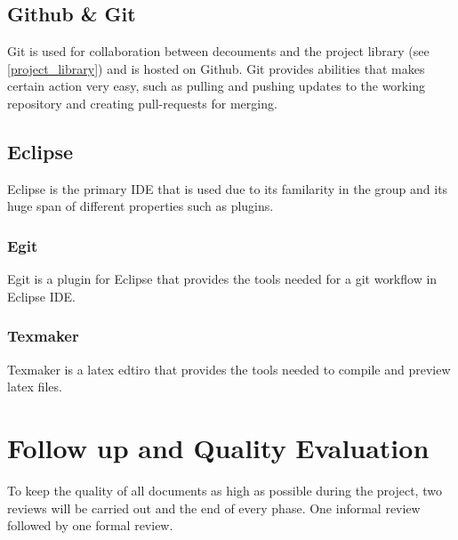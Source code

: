 \documentclass{article}
\begin{document}
    \subsection{Github \& Git}
    Git is used for collaboration between decouments and the project library (see \ref{project_library})
    and is hosted on Github. Git provides abilities that  makes certain action very
    easy, such as pulling and pushing updates to the working repository and creating pull-requests for merging.
    
    \subsection{Eclipse}
        Eclipse is the primary IDE that is used due to its familarity in
        the group and its huge span of different properties such as plugins.
    
        \subsubsection{Egit}
            Egit is a plugin for Eclipse that provides the tools needed for a git workflow 
            in Eclipse IDE.
            
        \subsubsection{Texmaker}
            Texmaker is a latex edtiro that provides the tools needed to compile and preview latex files.
    
\section{Follow up and Quality Evaluation}
    To keep the quality of all documents as high as possible during the project,
    two reviews will be carried out and the end of every phase. One informal review
    followed by one formal review.
\end{document}
